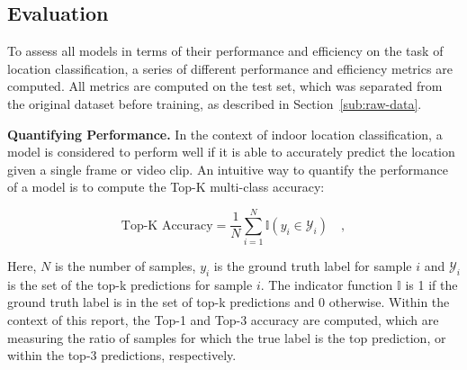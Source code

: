 \documentclass[a4paper]{article}
\begin{document}


\subsection{Evaluation} %
\label{sub:evaluation}

To assess all models in terms of their performance and efficiency on the task
of location classification, a series of different performance and efficiency
metrics are computed. All metrics are computed on the test set, which was
separated from the original dataset before training, as described in
Section~\ref{sub:raw-data}.

\textbf{Quantifying Performance.} In the context of indoor location
classification, a model is considered to perform well if it is able to
accurately predict the location given a single frame or video clip. An intuitive
way to quantify the performance of a model is to compute the Top-K multi-class
accuracy:

\begin{equation}
  \text{Top-K Accuracy} = \frac{1}{N} \sum_{i=1}^{N} \mathbb{I}(y_i \in
  \mathcal{Y}_i) \quad ,
  \label{eq:top-k-accuracy}
\end{equation}

Here, $N$ is the number of samples, $y_i$ is the ground truth label for sample
$i$ and $\mathcal{Y}_i$ is the set of the top-k predictions for sample $i$. The
indicator function $\mathbb{I}$ is 1 if the ground truth label is in the set of
top-k predictions and 0 otherwise. Within the context of this report, the Top-1
and Top-3 accuracy are computed, which are measuring the ratio of samples for
which the true label is the top prediction, or within the top-3 predictions,
respectively.
\end{document}
